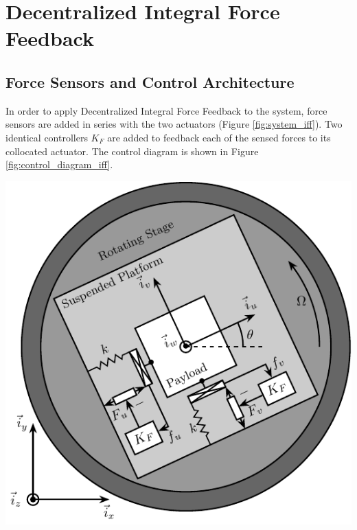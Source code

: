 \documentclass{ISMA_USD2020}
\begin{document}
\section{Decentralized Integral Force Feedback}
\label{sec:orgd6c59cc}
\label{sec:iff}
\subsection{Force Sensors and Control Architecture}
\label{sec:orgcc446a6}
In order to apply Decentralized Integral Force Feedback to the system, force sensors are added in series with the two actuators (Figure \ref{fig:system_iff}).
Two identical controllers \(K_F\) are added to feedback each of the sensed forces to its collocated actuator.
The control diagram is shown in Figure \ref{fig:control_diagram_iff}.

\begin{minipage}[t]{0.55\linewidth}
\begin{center}
\includegraphics[scale=1]{figs/system_iff.pdf}
\end{center}
\end{minipage}
\hfill
\end{document}
